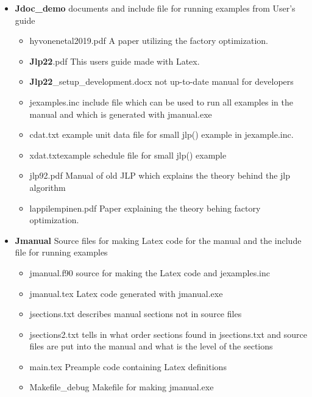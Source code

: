 \begin{itemize}
\begin{itemize}
\end{itemize}
\item \textbf{Jdoc\_demo} \hspace{1cm}documents and include file for running examples from User's guide
\begin{itemize}
\item hyvonenetal2019.pdf \hspace{1cm} A paper utilizing the factory optimization.
\item \textbf{Jlp22}.pdf \hspace{1cm} This users guide made with Latex.
\item 	 \textbf{Jlp22}\_setup\_development.docx \hspace{1cm} not up-to-date manual for developers
\item jexamples.inc \hspace{1cm}include file which can be used to run all examples in the manual
and which is generated with jmanual.exe
\item cdat.txt \hspace{1cm}example unit data file for small \textcolor{VioletRed}{jlp}() example in jexample.inc.
\item xdat.txt\hspace{1cm}example schedule file for small \textcolor{VioletRed}{jlp}() example
\item jlp92.pdf \hspace{1cm}Manual of old JLP which explains the theory behind the jlp algorithm
\item lappilempinen.pdf \hspace{1cm} Paper explaining the theory behing factory optimization.
\end{itemize}
\item \textbf{Jmanual} \hspace{1cm} Source files for making Latex code for
the manual and the include file for running examples
\begin{itemize}
\item jmanual.f90 \hspace{1cm}source for making the Latex code and jexamples.inc
\item jmanual.tex \hspace{1cm}Latex code generated with jmanual.exe
\item jsections.txt \hspace{1cm}describes manual sections not in source files
\item jsections2.txt \hspace{1cm}tells in what order sections found in jsections.txt
and source files are put into the manual and what is the level of the sections
\item main.tex  \hspace{1cm}Preample code containing Latex definitions
\item Makefile\_debug \hspace{1cm}Makefile for making jmanual.exe


\end{itemize}
\end{itemize}
